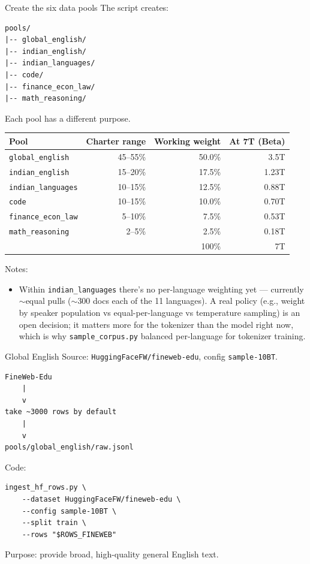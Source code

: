 \begin{paragraphblock}{Create the six data pools}
  The script creates:
\begin{lstlisting}[style=shadedpython,language={},basicstyle=\scriptsize\ttfamily]
pools/
|-- global_english/
|-- indian_english/
|-- indian_languages/
|-- code/
|-- finance_econ_law/
|-- math_reasoning/
\end{lstlisting}
  Each pool has a different purpose.

  \begin{center}
    \renewcommand{\arraystretch}{1.2}
    \small
    \begin{tabular}{@{}l r r r@{}}
      \textbf{Pool} & \textbf{Charter range} & \textbf{Working weight} &
      \textbf{At 7T (Beta)} \\
      \hline
      \texttt{global\_english} & 45--55\% & 50.0\% & 3.5T \\
      \texttt{indian\_english} & 15--20\% & 17.5\% & 1.23T \\
      \texttt{indian\_languages} & 10--15\% & 12.5\% & 0.88T \\
      \texttt{code} & 10--15\% & 10.0\% & 0.70T \\
      \texttt{finance\_econ\_law} & 5--10\% & 7.5\% & 0.53T \\
      \texttt{math\_reasoning} & 2--5\% & 2.5\% & 0.18T \\
      \hline
      & & 100\% & 7T \\
    \end{tabular}
  \end{center}

  Notes:
  \begin{itemize}
      \setlength{\itemsep}{0pt}
    \item Within \texttt{indian\_languages} there's no per-language
      weighting yet --- currently $\sim$equal pulls ($\sim$300 docs
      each of the 11 languages). A real policy (e.g., weight by speaker
      population vs equal-per-language vs temperature sampling) is an
      open decision; it matters more for the tokenizer than the model
      right now, which is why \texttt{sample\_corpus.py} balanced
      per-language for tokenizer training.
  \end{itemize}
\end{paragraphblock}

\begin{paragraphblock}{Global English}
  Source: \texttt{HuggingFaceFW/fineweb-edu}, config \texttt{sample-10BT}.

\begin{lstlisting}[style=shadedpython,language={},basicstyle=\scriptsize\ttfamily]
FineWeb-Edu
    |
    v
take ~3000 rows by default
    |
    v
pools/global_english/raw.jsonl
\end{lstlisting}

  Code:
\begin{lstlisting}[style=shadedpython,breaklines=true]
ingest_hf_rows.py \
    --dataset HuggingFaceFW/fineweb-edu \
    --config sample-10BT \
    --split train \
    --rows "$ROWS_FINEWEB"
\end{lstlisting}
  Purpose: provide broad, high-quality general English text.
\end{paragraphblock}

